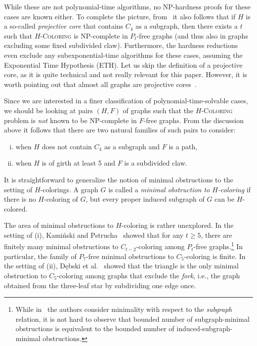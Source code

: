 \documentclass[11pt,a4paper]{article}
\theoremstyle{mystyle}
\newcommand{\colo}[1]{\ensuremath{#1}-\textsc{Coloring}\xspace}
\newcommand{\NP}{\textsf{NP}}
\begin{document}
While these are not polynomial-time algorithms, no \NP-hardness proofs for these cases are known either.
To complete the picture, from~\cite{DBLP:conf/stacs/OkrasaR21} it also follows that if $H$ is a so-called \emph{projective core} that  contains $C_4$ as a subgraph, then there exists a $t$ such that \colo{H} is \NP-complete in $P_t$-free graphs (and thus also in graphs excluding some fixed subdivided claw). Furthermore, the hardness reductions even exclude any subexponential-time algorithms for these cases, assuming the Exponential Time Hypothesis (ETH).
Let us skip the definition of a projective core, as it is quite technical and not really relevant for this paper. However, it is worth pointing out that almost all graphs are projective cores~\cite{DBLP:journals/jgt/LuczakN04,DBLP:journals/dm/HellN92}.

Since we are interested in a finer classification of polynomial-time-solvable cases, we should be looking at pairs $(H,F)$ of graphs such that the \colo{H} problem is \emph{not} known to be \NP-complete in $F$-free graphs. From the discussion above it follows that there are two natural families of such pairs to consider: 
\begin{enumerate}[(i)]
    \item when $H$ does not contain $C_4$ as a subgraph and $F$ is a path,
    \item when $H$ is of girth at least 5 and $F$ is a subdivided claw.
\end{enumerate}

It is straightforward to generalize the notion of minimal obstructions to the setting of $H$-colorings.
A graph $G$ is called a \emph{minimal obstruction to $H$-coloring} if there is no $H$-coloring of $G$, but every proper induced subgraph of $G$ can be $H$-colored.

The area of minimal obstructions to $H$-coloring is rather unexplored.
In the setting of (i), Kamiński and Pstrucha~\cite{DBLP:journals/dam/KaminskiP19} showed that for any $t\geq 5$, there are  finitely many minimal obstructions to $C_{t-2}$-coloring among $P_t$-free graphs.\footnote{While in~\cite{DBLP:journals/dam/KaminskiP19} the authors consider minimality with respect to the \emph{subgraph} relation, it is not hard to observe that bounded number of subgraph-minimal obstructions is equivalent to the bounded number of induced-subgraph-minimal obstructions.}
In particular, the family of $P_7$-free minimal obstructions to $C_5$-coloring is finite. 
In the setting of (ii), Dębski et al.~\cite{debski_et_al:LIPIcs.ISAAC.2022.14} showed that the triangle is the only minimal obstruction to $C_5$-coloring among graphs that exclude the \emph{fork}, i.e., the graph obtained from the three-leaf star by subdividing one edge once.
\end{document}
